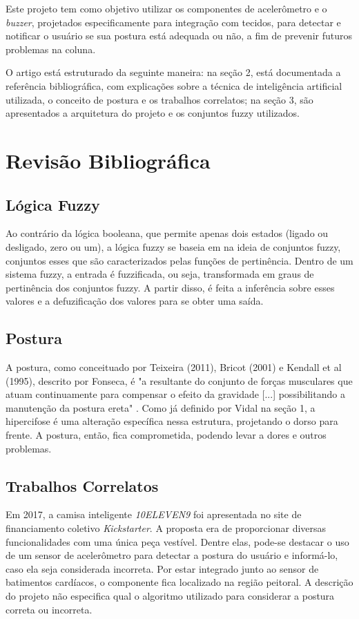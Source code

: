 \documentclass[12pt]{article}
\begin{document}
Este projeto tem como objetivo utilizar os componentes de acelerômetro e o \textit{buzzer}, projetados especificamente para integração com tecidos, para detectar e notificar o usuário se sua postura está adequada ou não, a fim de prevenir futuros problemas na coluna.

O artigo está estruturado da seguinte maneira: na seção 2, está documentada a referência bibliográfica, com explicações sobre a técnica de inteligência artificial utilizada, o conceito de postura e os trabalhos correlatos; na seção 3, são apresentados a arquitetura do projeto e os conjuntos fuzzy utilizados.

\section{Revisão Bibliográfica}
\subsection{Lógica Fuzzy}
Ao contrário da lógica booleana, que permite apenas dois estados (ligado ou desligado, zero ou um), a lógica fuzzy se baseia em na ideia de conjuntos fuzzy, conjuntos esses que são caracterizados pelas funções de pertinência. Dentro de um sistema fuzzy, a entrada é fuzzificada, ou seja, transformada em graus de pertinência dos conjuntos fuzzy. A partir disso, é feita a inferência sobre esses valores e a defuzificação dos valores para se obter uma saída.

\subsection{Postura}
A postura, como conceituado por Teixeira (2011), Bricot (2001) e Kendall et al (1995), descrito por Fonseca, é "a resultante do conjunto de forças musculares que atuam continuamente para compensar o efeito da gravidade [...] possibilitando a manutenção da postura ereta"  \cite{fonseca:2015}. Como já definido por Vidal na seção 1, a hipercifose é uma alteração específica nessa estrutura, projetando o dorso para frente. A postura, então, fica comprometida, podendo levar a dores e outros problemas.
\subsection{Trabalhos Correlatos}
Em 2017, a camisa inteligente \textit{10ELEVEN9} \cite{colorfy:17} foi apresentada no site de financiamento coletivo \textit{Kickstarter}. A proposta era de proporcionar diversas funcionalidades com uma única peça vestível. Dentre elas, pode-se destacar o uso de um sensor de acelerômetro para detectar a postura do usuário e informá-lo, caso ela seja considerada incorreta. Por estar integrado junto ao sensor de batimentos cardíacos, o componente fica localizado na região peitoral. A descrição do projeto não especifica qual o algoritmo utilizado para considerar a postura correta ou incorreta.
\end{document}

